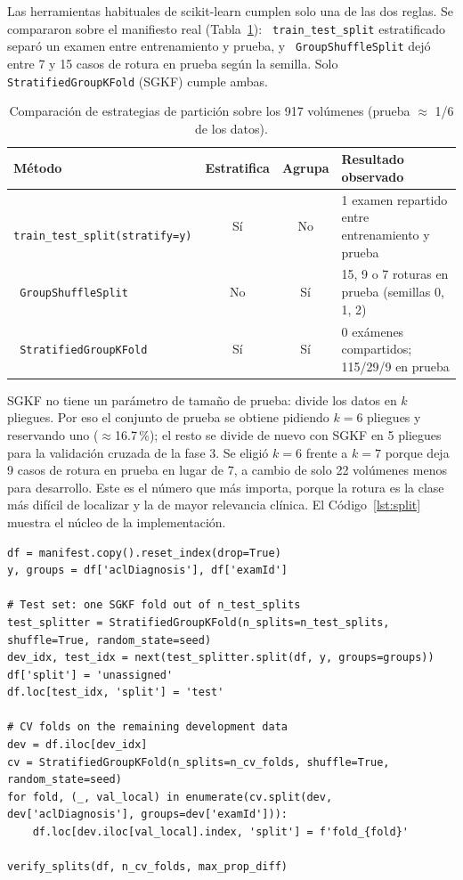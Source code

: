 \documentclass[12pt,letterpaper]{article}
\newcommand{\code}[1]{\texttt{\hyphenchar\font=-1 #1}}
\begin{document}
\noindent Las herramientas habituales de scikit-learn cumplen solo una de las dos reglas. Se compararon sobre el manifiesto real (Tabla~\ref{tab:splitters}): \code{train\_test\_split} estratificado separó un examen entre entrenamiento y prueba, y \code{GroupShuffleSplit} dejó entre 7 y 15 casos de rotura en prueba según la semilla. Solo \code{StratifiedGroupKFold} (SGKF) cumple ambas.

\begin{table}[!htbp]
\centering
\small
\caption{Comparación de estrategias de partición sobre los 917 volúmenes (prueba $\approx$ 1/6 de los datos).}
\label{tab:splitters}
\begin{tabular}{lccp{5.6cm}}
\toprule
Método & Estratifica & Agrupa & Resultado observado \\
\midrule
\code{train\_test\_split(stratify=y)} & Sí & No & 1 examen repartido entre entrenamiento y prueba \\
\code{GroupShuffleSplit} & No & Sí & 15, 9 o 7 roturas en prueba (semillas 0, 1, 2) \\
\code{StratifiedGroupKFold} & Sí & Sí & 0 exámenes compartidos; 115/29/9 en prueba \\
\bottomrule
\end{tabular}
\end{table}

SGKF no tiene un parámetro de tamaño de prueba: divide los datos en $k$ pliegues. Por eso el conjunto de prueba se obtiene pidiendo $k=6$ pliegues y reservando uno ($\approx$16.7\,\%); el resto se divide de nuevo con SGKF en 5 pliegues para la validación cruzada de la fase 3. Se eligió $k=6$ frente a $k=7$ porque deja 9 casos de rotura en prueba en lugar de 7, a cambio de solo 22 volúmenes menos para desarrollo. Este es el número que más importa, porque la rotura es la clase más difícil de localizar y la de mayor relevancia clínica. El Código~\ref{lst:split} muestra el núcleo de la implementación.

\begin{lstlisting}[caption={Partición en dos niveles (\code{src/data/split.py}, abreviado).}, label={lst:split}]
df = manifest.copy().reset_index(drop=True)
y, groups = df['aclDiagnosis'], df['examId']

# Test set: one SGKF fold out of n_test_splits
test_splitter = StratifiedGroupKFold(n_splits=n_test_splits, shuffle=True, random_state=seed)
dev_idx, test_idx = next(test_splitter.split(df, y, groups=groups))
df['split'] = 'unassigned'
df.loc[test_idx, 'split'] = 'test'

# CV folds on the remaining development data
dev = df.iloc[dev_idx]
cv = StratifiedGroupKFold(n_splits=n_cv_folds, shuffle=True, random_state=seed)
for fold, (_, val_local) in enumerate(cv.split(dev, dev['aclDiagnosis'], groups=dev['examId'])):
    df.loc[dev.iloc[val_local].index, 'split'] = f'fold_{fold}'

verify_splits(df, n_cv_folds, max_prop_diff)
\end{lstlisting}
\end{document}
